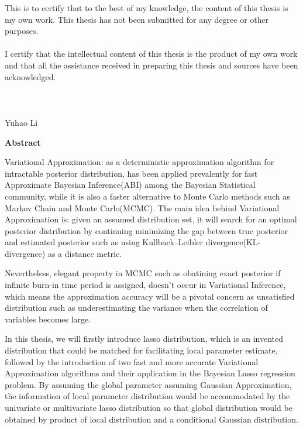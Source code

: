\noindent This is to certify that to the best of my knowledge, the content of this thesis is my own work. This thesis has not been submitted for any degree or other purposes.\\
\\
\noindent I certify that the intellectual content of this thesis is the product of my own work and that all the assistance received in preparing this thesis and sources have been acknowledged.\\
\\
\\
\\
Yuhao Li

\pagebreak
\hspace{0pt}

\begin{center}
    \textbf{\large Abstract }\\
    \vspace{0.5cm}
\end{center}
Variational Approximation: as a deterministic approximation algorithm for intractable posterior distribution, has been applied prevalently for fast Approximate Bayesian Inference(ABI) among the Bayesian Statistical community, while it is also a faster alternative to Monte Carlo methods such as Markov Chain and Monte Carlo(MCMC).
The main idea behind Variational Approximation is: given an assumed distribution set, it will search for an optimal posterior distribution by continuing minimizing the gap between true posterior and estimated posterior such as using Kullback–Leibler divergence(KL-divergence) as a distance metric.

Nevertheless, elegant property in MCMC such as obatining exact posterior if infinite burn-in time period is assigned, doesn't occur in Variational Inference, which means the approximation accuracy will be a pivotal concern as  unsatisfied distribution such as underestimating the variance when the correlation of variables becomes large. 

In this thesis, we will firstly introduce lasso distribution, which is an invented distribution that could be matched for facilitating local parameter estimate, followed by the introduction of two fast and more accurate Variational Approximation algorithms and their application in the Bayesian Lasso regression problem. By assuming the global parameter assuming Gaussian Approximation, the information of local parameter distribution would be accommodated by the univariate or multivariate lasso distribution so that 
global distribution would be obtained by product of local distribution and a conditional Gaussian distribution.


